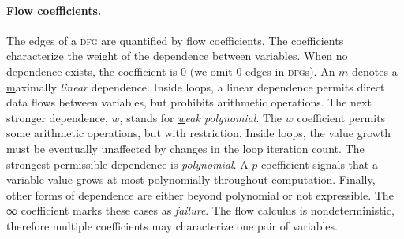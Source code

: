 \paragraph*{Flow coefficients.}
The edges of a \textsc{dfg} are quantified by {flow coefficients}.
The coefficients characterize the weight of the dependence between variables.
When no dependence exists, the coefficient is \(0\) (we omit \(0\)-edges in \textsc{dfg}s).
An \(m\) denotes a \underline{m}aximally \emph{linear} dependence.
Inside loops, a linear dependence permits direct data flows between variables, but prohibits arithmetic operations.
The next stronger dependence, \(w\), stands for \emph{\underline{w}eak polynomial}.
The \(w\) coefficient permits some arithmetic operations, but with restriction.
Inside loops, the value growth must be eventually unaffected by changes in the loop iteration count.
The strongest permissible dependence is \emph{\underline{p}olynomial}.
A \(p\) coefficient signals that a variable value grows at most polynomially throughout computation.
Finally, other forms of dependence are either beyond polynomial or not expressible.
The ∞ coefficient marks these cases as \emph{failure}.
The flow calculus is nondeterministic, therefore multiple coefficients may characterize one pair of variables.

